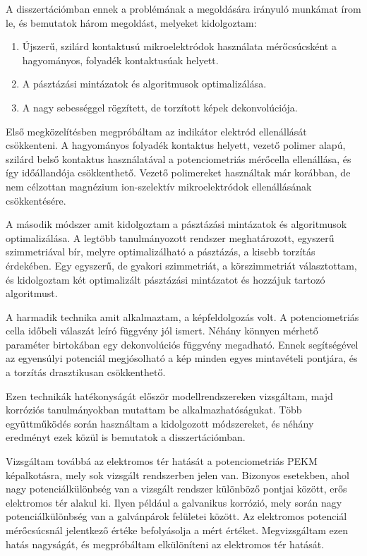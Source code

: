 A disszertációmban ennek a problémának a megoldására irányuló munkámat írom le, és bemutatok három megoldást, melyeket kidolgoztam:

\begin{enumerate}
\item Újszerű, szilárd kontaktusú mikroelektródok használata mérőcsúcsként a hagyományos, folyadék kontaktusúak helyett.
\item A pásztázási mintázatok és algoritmusok optimalizálása.
\item A nagy sebességgel rögzített, de torzított képek dekonvolúciója.
\end{enumerate}

Első megközelítésben megpróbáltam az indikátor elektród ellenállását csökkenteni.
A hagyományos folyadék kontaktus helyett, vezető polimer alapú, szilárd belső kontaktus használatával a potenciometriás mérőcella ellenállása, és így időállandója csökkenthető.
Vezető polimereket használtak már korábban, de nem célzottan magnézium ion-szelektív mikroelektródok ellenállásának csökkentésére.

A második módszer amit kidolgoztam a pásztázási mintázatok és algoritmusok optimalizálása.
A legtöbb tanulmányozott rendszer meghatározott, egyszerű szimmetriával bír, melyre optimalizálható a pásztázás, a kisebb torzítás érdekében.
Egy egyszerű, de gyakori szimmetriát, a körszimmetriát választottam, és kidolgoztam két optimalizált pásztázási mintázatot és hozzájuk tartozó algoritmust.

A harmadik technika amit alkalmaztam, a képfeldolgozás volt.
A potenciometriás cella időbeli válaszát leíró függvény jól ismert.
Néhány könnyen mérhető paraméter birtokában egy dekonvolúciós függvény megadható.
Ennek segítségével az egyensúlyi potenciál megjósolható a kép minden egyes mintavételi pontjára, és a torzítás drasztikusan csökkenthető.

Ezen technikák hatékonyságát először modellrendszereken vizsgáltam, majd korróziós tanulmányokban mutattam be alkalmazhatóságukat.
Több együttműködés során használtam a kidolgozott módszereket, és néhány eredményt ezek közül is bemutatok a disszertációmban.

Vizsgáltam továbbá az elektromos tér hatását a potenciometriás PEKM képalkotásra, mely sok vizsgált rendszerben jelen van.
Bizonyos esetekben, ahol nagy potenciálkülönbség van a vizsgált rendszer különböző pontjai között, erős elektromos tér alakul ki.
Ilyen például a galvanikus korrózió, mely során nagy potenciálkülönbség van a galvánpárok felületei között.
Az elektromos potenciál mérőcsúcsnál jelentkező értéke befolyásolja a mért értéket.
Megvizsgáltam ezen hatás nagyságát, és megpróbáltam elkülöníteni az elektromos tér hatását.
